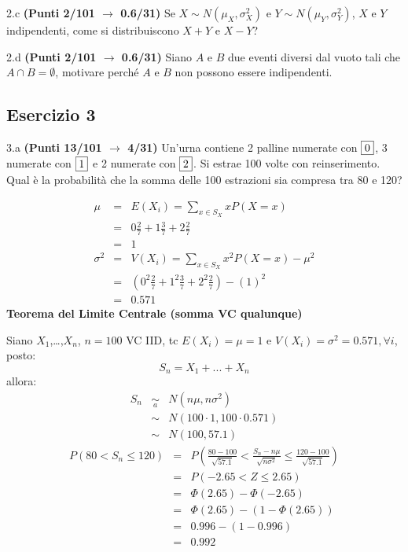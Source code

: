 \documentclass[
  11pt,
]{book}
\theoremstyle{mytheoremstyle}
\theoremstyle{mydefstyle}
\newenvironment{sol}
  {
  \begin{tcolorbox}[enhanced,breakable,arc=0.1mm,boxrule=1pt,colback=white,colframe=iblue,
  title=\bf \fontfamily{lmss}\selectfont \hspace{.5 cm} Soluzione,drop fuzzy shadow]

}{
\end{tcolorbox}
  }
\begin{document}
2.c \textbf{(Punti 2/101 \(\rightarrow\) 0.6/31)} Se \(X\sim N(\mu_X,\sigma_X^2)\) e \(Y\sim N(\mu_Y,\sigma_Y^2)\), \(X\) e \(Y\) indipendenti, come si distribuiscono \(X+Y\) e \(X-Y\)?

2.d \textbf{(Punti 2/101 \(\rightarrow\) 0.6/31)} Siano \(A\) e \(B\) due eventi diversi dal vuoto tali che \(A\cap B=\emptyset\), motivare perché \(A\) e \(B\) non possono essere indipendenti.

\subsection{Esercizio 3}\label{esercizio-3-22}

3.a \textbf{(Punti 13/101 \(\rightarrow\) 4/31)} Un'urna contiene 2 palline numerate con \(\fbox{0}\), 3 numerate con \(\fbox{1}\) e 2 numerate con \(\fbox{2}\). Si estrae 100 volte con reinserimento. Qual è la probabilità che la somma delle 100 estrazioni sia compresa tra 80 e 120?

\begin{sol}
\begin{eqnarray*} \mu &=& E(X_i) = \sum_{x\in S_X}x P(X=x)\\ 
 &=&  0  \frac { 2 }{ 7 }+ 1  \frac { 3 }{ 7 }+ 2  \frac { 2 }{ 7 } \\ 
            &=& 1 \\ 
 \sigma^2 &=& V(X_i) = \sum_{x\in S_X}x^2 P(X=x)-\mu^2\\ 
 &=&\left(  0  ^2\frac { 2 }{ 7 }+ 1  ^2\frac { 3 }{ 7 }+ 2  ^2\frac { 2 }{ 7 } \right)-( 1 )^2\\ 
            &=& 0.571 
\end{eqnarray*}
\textbf{Teorema del Limite Centrale (somma VC qualunque)}

Siano \(X_1\),\ldots,\(X_n\), \(n=100\) VC IID, tc \(E(X_i)=\mu=1\) e \(V(X_i)=\sigma^2=0.571,\forall i\), posto:
\[
      S_n = X_1 + ... + X_n
      \]
allora:\begin{eqnarray*}
  S_n & \mathop{\sim}\limits_{a}& N(n\mu,n\sigma^2) \\
     &\sim & N(100\cdot1,100\cdot0.571) \\
     &\sim & N(100,57.1) 
  \end{eqnarray*}\begin{eqnarray*}
   P( 80 < S_n \leq  120 ) &=& P\left( \frac { 80  -  100 }{\sqrt{ 57.1 }} < \frac { S_n  -  n\mu }{ \sqrt{n\sigma^2} } \leq \frac { 120  -  100 }{\sqrt{ 57.1 }}\right)  \\
              &=& P\left(  -2.65  < Z \leq  2.65 \right) \\
              &=& \Phi( 2.65 )-\Phi( -2.65 )\\
              &=&  \Phi( 2.65 )-(1-\Phi( 2.65 )) \\ &=&  0.996 -(1- 0.996 ) \\ 
              &=&  0.992 
   \end{eqnarray*}

\end{sol}
\end{document}
